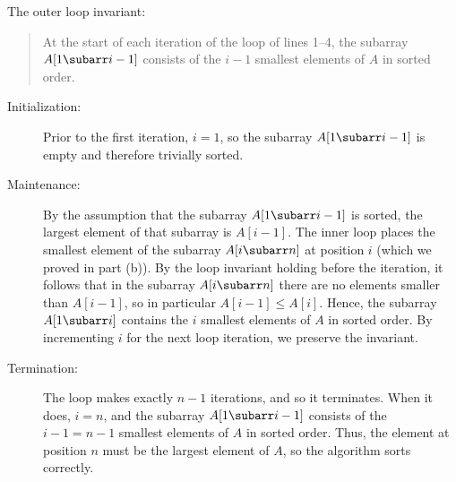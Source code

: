 The outer loop invariant:
\begin{quote}
    At the start of each iteration of the  loop of lines 1--4, the subarray $A[1\subarr i-1]$ consists of the $i-1$ smallest elements of $A$ in sorted order.
\end{quote}

\begin{description}
    \item[Initialization:] Prior to the first iteration, $i=1$, so the subarray $A[1\subarr i-1]$ is empty and therefore trivially sorted.
    \item[Maintenance:] By the assumption that the subarray $A[1\subarr i-1]$ is sorted, the largest element of that subarray is $A[i-1]$.
    The inner  loop places the smallest element of the subarray $A[i\subarr n]$ at position $i$ (which we proved in part (b)).
    By the loop invariant holding before the iteration, it follows that in the subarray $A[i\subarr n]$ there are no elements smaller than $A[i-1]$, so in particular $A[i-1]\le A[i]$.
    Hence, the subarray $A[1\subarr i]$ contains the $i$ smallest elements of $A$ in sorted order.
    By incrementing $i$ for the next loop iteration, we preserve the invariant.
    \item[Termination:] The loop makes exactly $n-1$ iterations, and so it terminates.
    When it does, $i=n$, and the subarray $A[1\subarr i-1]$ consists of the $i-1=n-1$ smallest elements of $A$ in sorted order.
    Thus, the element at position $n$ must be the largest element of $A$, so the algorithm sorts correctly.
\end{description}

